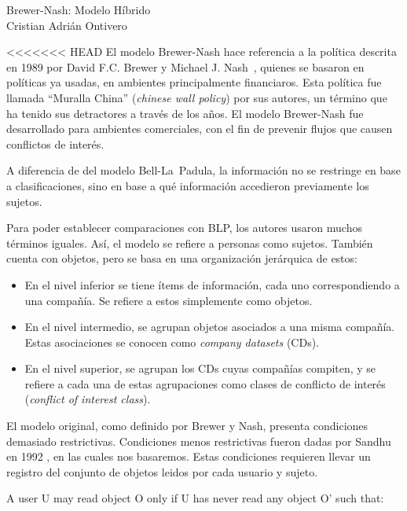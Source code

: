 \documentclass[spanish]{article}
\theoremstyle{definition}
\begin{document}
\begin{center}
  {\LARGE Brewer-Nash: Modelo Híbrido}\\[.2cm]
  Cristian Adrián Ontivero \\[.05cm]%
  \isodate%
\end{center}

\vspace{0.2 cm}

<<<<<<< HEAD
El modelo Brewer-Nash hace referencia a la política descrita en 1989 por David
F.C. Brewer y Michael J. Nash~\cite{bn89}, quienes se basaron en políticas
ya usadas, en ambientes principalmente financiaros. Esta política fue llamada
``Muralla China'' (\textit{chinese wall policy}) por sus autores, un término que
ha tenido sus detractores a través de los años. El modelo Brewer-Nash fue
desarrollado para ambientes comerciales, con el fin de prevenir flujos que
causen conflictos de interés.

A diferencia de del modelo Bell-La~Padula, la información no se restringe en
base a clasificaciones, sino en base a qué información accedieron previamente
los sujetos.

Para poder establecer comparaciones con BLP, los autores usaron muchos
términos iguales. Así, el modelo se refiere a personas como sujetos. También
cuenta con objetos, pero se basa en una organización jerárquica de estos:
\begin{itemize}
      \item En el nivel inferior se tiene ítems de información, cada uno
        correspondiendo a una compañía. Se refiere a estos simplemente como
        objetos.
      \item En el nivel intermedio, se agrupan objetos asociados a una misma
        compañía. Estas asociaciones se conocen como \textit{company datasets}
        (CDs).
      \item En el nivel superior, se agrupan los CDs cuyas compañías compiten, y
        se refiere a cada una de estas agrupaciones como clases de conflicto de
        interés (\textit{conflict of interest class}).
\end{itemize}

El modelo original, como definido por Brewer y Nash, presenta condiciones
demasiado restrictivas. Condiciones menos restrictivas fueron dadas por Sandhu
en 1992 \cite{Sandhu92}, en las cuales nos basaremos. Estas condiciones
requieren llevar un registro del conjunto de objetos leidos por cada usuario y
sujeto.

    A user U may read object O only if U has never read any object O' such that:
\end{document}
